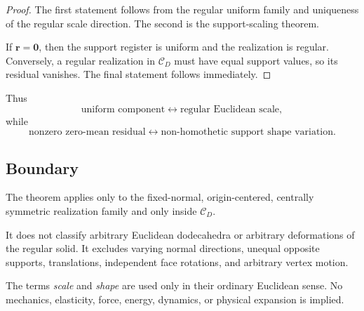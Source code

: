\begin{proof}
The first statement follows from the regular uniform family and uniqueness
of the regular scale direction. The second is the support-scaling theorem.

If \(\mathbf r=\mathbf 0\), then the support register is uniform and the
realization is regular. Conversely, a regular realization in
\(\mathcal C_D\) must have equal support values, so its residual vanishes.
The final statement follows immediately.
\end{proof}

Thus
\[
\text{uniform component}
\longleftrightarrow
\text{regular Euclidean scale},
\]
while
\[
\text{nonzero zero-mean residual}
\longleftrightarrow
\text{non-homothetic support shape variation}.
\]

\subsection{Boundary}

The theorem applies only to the fixed-normal, origin-centered, centrally
symmetric realization family and only inside \(\mathcal C_D\).

It does not classify arbitrary Euclidean dodecahedra or arbitrary
deformations of the regular solid. It excludes varying normal directions,
unequal opposite supports, translations, independent face rotations, and
arbitrary vertex motion.

The terms \emph{scale} and \emph{shape} are used only in their ordinary
Euclidean sense. No mechanics, elasticity, force, energy, dynamics, or
physical expansion is implied.

